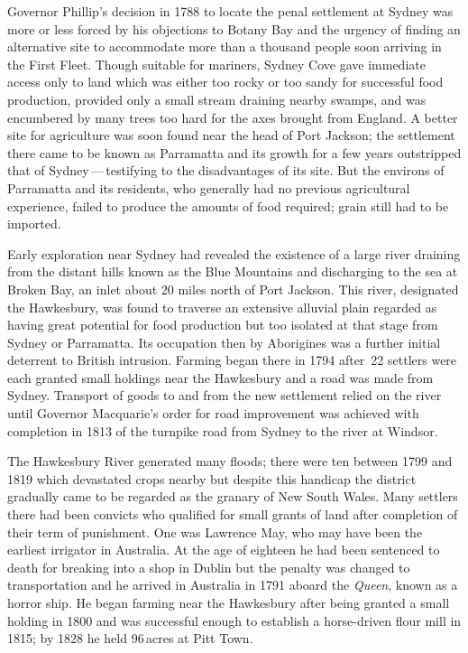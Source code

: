 Governor Phillip's decision in 1788 to locate
the penal settlement at Sydney was more or less
forced by his objections to Botany Bay and the
urgency of finding an alternative site to accommodate more than a
thousand people soon arriving in the First Fleet.  Though suitable for
mariners, Sydney Cove gave immediate access only to land which was
either too rocky or too sandy for successful food production, provided
only a small stream draining nearby swamps, and was encumbered by many
trees too hard for the axes brought from England.  A better site for
agriculture was soon found near the head of Port Jackson; the settlement there came to be known as Parramatta
 and its growth for a few years outstripped that
of Sydney\,---\,testifying to the disadvantages of its site.  But the
environs of Parramatta and its residents, who generally had no
previous agricultural experience, failed to produce the amounts of
food required; grain still had to be imported.

Early exploration near Sydney had revealed the existence of a large
river draining from the distant hills known as the Blue Mountains and
discharging to the sea at Broken Bay, an inlet about 20 miles north of
Port Jackson.  This river, designated the
Hawkesbury, was found to traverse an extensive
alluvial plain regarded as having great potential for food production
but too isolated at that stage from Sydney or Parramatta.  Its
occupation then by Aborigines was a further initial deterrent to
British intrusion.  Farming began there in 1794 after~22 settlers were
each granted small holdings near the Hawkesbury and a road was made
from Sydney. Transport of goods to and from the new settlement relied
on the river until Governor Macquarie's
order for road improvement was achieved with completion in 1813 of the
turnpike road from Sydney to the river at Windsor.

The Hawkesbury River generated many floods; there were ten between
1799 and 1819 which devastated crops nearby but despite this handicap
the district gradually came to be regarded as the granary of New South
Wales. Many settlers there had been convicts who qualified for small
grants of land after completion of their term of punishment. One was
Lawrence May, who may have been the earliest irrigator
in Australia. At the age of eighteen he had been sentenced to death
for breaking into a shop in Dublin but the penalty was changed to
transportation and he arrived in Australia in 1791 aboard the
\textsl{Queen}, known as a horror ship. He began farming near the
Hawkesbury after being granted a small holding in 1800 and was
successful enough to establish a horse-driven flour mill in 1815; by
1828 he held 96\,acres at Pitt Town.

